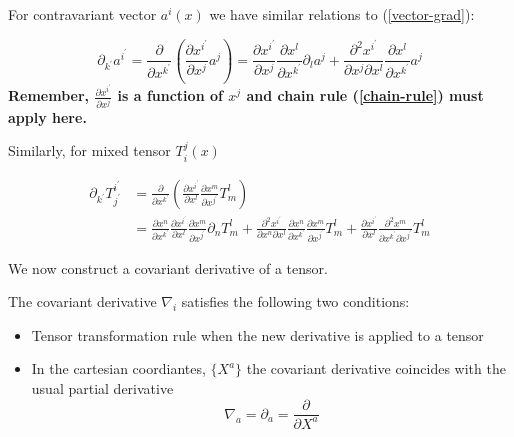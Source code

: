 For contravariant vector $a^i(x)$ we have similar relations to (\ref{vector-grad}):
\begin{qt}
\begin{equation}
\partial_{k^{\prime}} a^{i^{\prime}}=\frac{\partial}{\partial x^{k^{\prime}}}\left(\frac{\partial x^{i^{\prime}}}{\partial x^{j}} a^{j}\right)=\frac{\partial x^{i^{\prime}}}{\partial x^{j}} \frac{\partial x^{l}}{\partial x^{k^{\prime}}} \partial_{l} a^{j}+\frac{\partial^{2} x^{i^{\prime}}}{\partial x^{j} \partial x^{l}} \frac{\partial x^{l}}{\partial x^{k^{\prime}}} a^{j}
\end{equation}
\textbf{Remember, $\frac{\partial x^{i^{\prime}}}{\partial x^{j}}$ is a function of $x^j$ and chain rule (\ref{chain-rule}) must apply here.}
\end{qt}
Similarly, for mixed tensor $T_i^j(x)$
\begin{qt}
\begin{equation}
\begin{aligned}
\partial_{k^{\prime}} T_{j^{\prime}}^{i^{\prime}} &=\frac{\partial}{\partial x^{k^{\prime}}}\left(\frac{\partial x^{i^{\prime}}}{\partial x^{l}} \frac{\partial x^{m}}{\partial x^{j^{\prime}}} T_{m}^{l}\right) \\
&=\frac{\partial x^{n}}{\partial x^{k^{\prime}}} \frac{\partial x^{i^{\prime}}}{\partial x^{l}} \frac{\partial x^{m}}{\partial x^{j^{\prime}}} \partial_{n} T_{m}^{l}+\frac{\partial^{2} x^{i^{\prime}}}{\partial x^{n} \partial x^{l}} \frac{\partial x^{n}}{\partial x^{k^{\prime}}} \frac{\partial x^{m}}{\partial x^{j^{\prime}}} T_{m}^{l}+\frac{\partial x^{i^{\prime}}}{\partial x^{l}} \frac{\partial^{2} x^{m}}{\partial x^{k^{\prime}} \partial x^{j^{\prime}}} T_{m}^{l}
\end{aligned}
\end{equation}
\end{qt}

We now construct a covariant derivative of a tensor.
\begin{defi}
        The covariant derivative $\nabla_i$ satisfies the following two conditions:
        \begin{itemize}
            \item Tensor transformation rule when the new derivative is applied to a tensor
            \item In the cartesian coordiantes, $\{X^a\}$ the covariant derivative coincides with the usual partial derivative
            $$
\nabla_{a}=\partial_{a}=\frac{\partial}{\partial X^{a}}
$$
        \end{itemize}
\end{defi}

